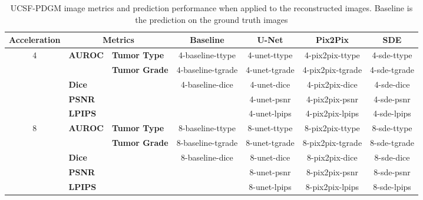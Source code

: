 \begin{table}[]
    \centering
    \caption{UCSF-PDGM image metrics and prediction performance when applied to the reconstructed images. Baseline is the prediction on the ground truth images}\label{tab:ucsf_perf}
    \begin{tabular}{cll|cccc}
    \hline
    \multicolumn{1}{l}{\textbf{Acceleration}} & \multicolumn{2}{c|}{\textbf{Metrics}}         & \textbf{Baseline} & \textbf{U-Net} & \textbf{Pix2Pix} & \textbf{SDE} \\ \hline
    \multirow{5}{*}{4}               & \multirow{2}{*}{\textbf{AUROC}} & \textbf{Tumor Type}  &    4-baseline-ttype      &   4-unet-ttype   &  4-pix2pix-ttype   &     4-sde-ttype     \\
                                     &                        & \textbf{Tumor Grade} &   4-baseline-tgrade       &   4-unet-tgrade   &  4-pix2pix-tgrade   &     4-sde-tgrade     \\ \cline{2-3}
                                     & \multicolumn{2}{l|}{\textbf{Dice}}            &  4-baseline-dice        &   4-unet-dice   &  4-pix2pix-dice   &     4-sde-dice     \\ \cline{2-3}
                                     & \multicolumn{2}{l|}{\textbf{PSNR}}            &     \cellcolor[HTML]{C0C0C0}    &   4-unet-psnr   &  4-pix2pix-psnr   &     4-sde-psnr     \\
                                     & \multicolumn{2}{l|}{\textbf{LPIPS}}           &     \cellcolor[HTML]{C0C0C0}     &   4-unet-lpips   &  4-pix2pix-lpips   &     4-sde-lpips     \\ \hline
    \multirow{5}{*}{8}               & \multirow{2}{*}{\textbf{AUROC}} & \textbf{Tumor Type}  &   8-baseline-ttype       &   8-unet-ttype   &  8-pix2pix-ttype   &     8-sde-ttype     \\
                                     &                        & \textbf{Tumor Grade} &   8-baseline-tgrade       &   8-unet-tgrade   &  8-pix2pix-tgrade   &     8-sde-tgrade     \\ \cline{2-3}
                                     & \multicolumn{2}{l|}{\textbf{Dice}}            &  8-baseline-dice        &   8-unet-dice   &  8-pix2pix-dice   &     8-sde-dice     \\ \cline{2-3}
                                     & \multicolumn{2}{l|}{\textbf{PSNR}}            &   \cellcolor[HTML]{C0C0C0}      &   8-unet-psnr   &  8-pix2pix-psnr   &     8-sde-psnr     \\
                                     & \multicolumn{2}{l|}{\textbf{LPIPS}}           &   \cellcolor[HTML]{C0C0C0}       &   8-unet-lpips   &  8-pix2pix-lpips   &     8-sde-lpips     \\ \hline

\end{tabular}
\end{table}
